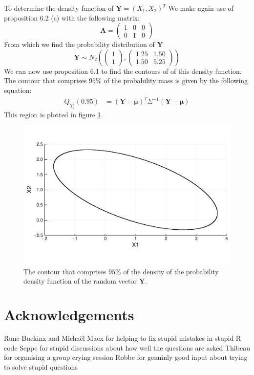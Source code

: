 \documentclass[a4paper]{article}
\begin{document}
To determine the density function of $\mathbf{Y}=(X_1, X_2)^T$ We make again use of proposition 6.2 (c) with the following matrix:
\begin{equation*}
	\mathbf{A} = \begin{pmatrix} 1 & 0 & 0\\ 0 & 1 & 0 \end{pmatrix}
\end{equation*}
From which we find the probability distribution of $\mathbf{Y}$
\begin{equation*}
	\mathbf{Y} \sim N_2\left( \begin{pmatrix}1\\1\end{pmatrix}, \begin{pmatrix}1.25&1.50\\1.50&5.25 \end{pmatrix}\right)
\end{equation*}
We can now use proposition 6.1 to find the contours of of this density function. The contour that comprises $95\%$ of the probability mass is given by the following equation:
\begin{align*}
	Q_{\chi^2_2}(0.95) &= (\mathbf{Y}-\mathbf{\mu})^T \Sigma^{-1} (\mathbf{Y}-\mathbf{\mu})
\end{align*}
This region is plotted in figure \ref{fig:4c}.
\begin{figure}
	\centering
	\includegraphics[width=.9\linewidth]{region-3c.pdf}
	\caption{The contour that comprises $95\%$ of the density of the probability density function of the random vector $\mathbf{Y}$.}
	\label{fig:4c}
\end{figure}

\section*{Acknowledgements}
Rune Buckinx and Michaël Maex for helping to fix stupid mistakes in stupid R code
Seppe for stupid discussions about how well the questions are asked
Thibeau for organising a group crying session
Robbe for genuinly good input about trying to solve stupid questions

\printbibliography
\end{document}
